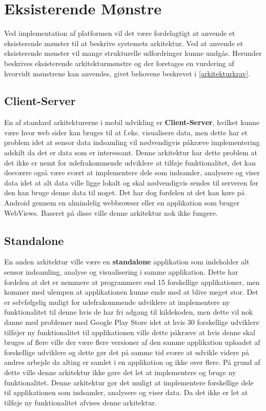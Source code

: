 \section{Eksisterende Mønstre}
Ved implementation af platformen vil det være fordelagtigt at anvende et eksisterende mønster til at beskrive systemets arkitektur.
Ved at anvende et eksisterende mønster vil mange strukturelle udfordringer kunne undgås.
Herunder beskrives eksisterende arkitekturmønstre og der foretages en vurdering af hvorvidt mønstrene kan anvendes, givet behovene beskrevet i \cref{arkitekturkrav}.

\subsection{Client-Server}
En af standard arkitekturerne i mobil udvikling er \textbf{Client-Server}, hvilket kunne være hvor web sider kan bruges til at f.eks. visualisere data, men dette har et problem idet at sensor data indsamling vil nødvendigvis påkræve implementering adskilt da det er data som er interessant.
Denne arkitektur har dette problem at det ikke er nemt for udefrakommende udviklere at tilføje funktionalitet, det kan desværre også være svært at implementere dele som indsamler, analysere og viser data idet at alt data ville ligge lokalt og skal nødvendigvis sendes til serveren før den kan bruge denne data til noget. 
Det har dog fordelen at det kan køre på Android gennem en almindelig webbrowser eller en applikation som bruger WebViews.
Baseret på disse ville denne arkitektur nok ikke fungere.
\subsection{Standalone}
En anden arkitektur ville være en \textbf{standalone} applikation som indeholder alt sensor indsamling, analyse og visualisering i samme applikation.
Dette har fordelen at det er nemmere at programmere end 15 forskellige applikationer, men kommer med ulempen at applikationen kunne ende med at blive meget stor.
Det er selvfølgelig muligt for udefrakommende udviklere at implementere ny funktionalitet til denne hvis de har fri adgang til kildekoden, men dette vil nok danne med problemer med Google Play Store idet at hvis 30 forskellige udviklere tilføjer ny funktionalitet til applikationen ville dette påkræve at hvis denne skal bruges af flere ville der være flere versioner af den samme applikation uploadet af forskellige udviklere og dette gør det på samme tid svære at udvikle videre på andres arbejde da alting er samlet i en applikation og ikke over flere.
På grund af dette ville denne arkitektur ikke gøre det let at implementere og bruge ny funktionalitet.
Denne arkitektur gør det muligt at implementere forskellige dele til applikationen som indsamler, analysere og viser data.
Da det ikke er let at tilføje ny funktionalitet afvises denne arkitektur. 

